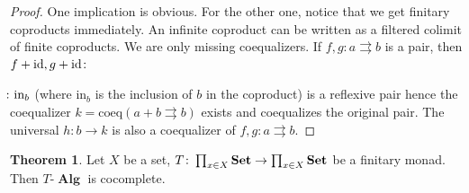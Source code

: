 \documentclass[a4paper,11pt,fullpage,oneside,openany]{amsbook}
\newcommand{\catname}[1]{{\normalfont\textbf{#1}}}
\DeclareMathOperator{\Alg}{\mathbf{Alg}}
\newcommand{\Set}{\catname{Set}}
\DeclareMathOperator{\id}{id}
\theoremstyle{definition}
\newtheorem{thm}{Theorem}[section] %
\theoremstyle{definition}
\theoremstyle{remark}
\begin{document}
\begin{proof}
One implication is obvious. For the other one, notice that we get finitary coproducts immediately. An infinite coproduct can be written as a filtered colimit of finite coproducts. We are only missing coequalizers. If $f,g\colon a\rightrightarrows b$ is a pair, then $f+\id,g+\id\colon\hspace{-1.5mm}$$\hspace{-1.5mm}\colon\text{in}_b$ (where in$_b$ is the inclusion of $b$ in the coproduct) is a reflexive pair hence the coequalizer $k=\text{coeq}(a+b\rightrightarrows b)$ exists and coequalizes the original pair. The universal $h\colon b\rightarrow k$ is also a coequalizer of $f,g\colon a\rightrightarrows b$.
\end{proof}
\begin{thm}
Let $X$ be a set, $T\colon\prod_{x\in X}\Set\to\prod_{x\in X}\Set$ be a finitary monad. Then $T\mbox{-}\Alg$ is cocomplete.
\end{thm}
\end{document}

